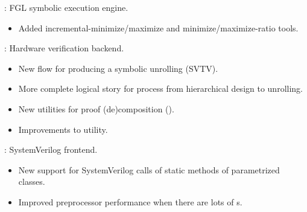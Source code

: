 
\begin{frame}

\implibtitle

:
FGL symbolic execution engine.
\begin{itemize}
\item Added incremental-minimize/maximize and minimize/maximize-ratio tools.
\end{itemize}
\end{frame}


\begin{frame}

\implibtitle

:
Hardware verification backend.
\begin{itemize}
\item New flow for producing a symbolic unrolling (SVTV).
\item More complete logical story for process
      from hierarchical design to unrolling.
\item New utilities for proof (de)composition ().
\item Improvements to  utility.
\end{itemize}

\end{frame}


\begin{frame}

\implibtitle

:
SystemVerilog frontend.
\begin{itemize}
\item New support for SystemVerilog calls of
      static methods of parametrized classes.
\item Improved preprocessor performance when there are lots of s.
\end{itemize}

\end{frame}


